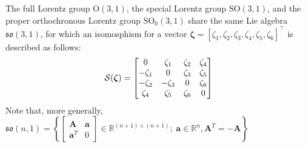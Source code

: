 \begin{example}
    The full Lorentz group $\text{O}(3, 1)$, the special Lorentz group $\text{SO}(3, 1)$, and the proper orthochronous Lorentz group $\text{SO}_0(3, 1)$ share the same Lie algebra $\mathfrak{so}(3, 1)$, for which an isomosphism for a vector $\boldsymbol{\zeta} = [\zeta_1, \zeta_2, \zeta_3, \zeta_4, \zeta_5, \zeta_6]^\top$ is described as follows:
    \begin{align}
        \SL[\boldsymbol{\zeta}] = \begin{bmatrix}
            0 & \zeta_1 & \zeta_2 & \zeta_4 \\
            -\zeta_1 & 0 & \zeta_3 & \zeta_5 \\
            -\zeta_2 & -\zeta_3 & 0 & \zeta_6 \\
            \zeta_4 & \zeta_5 & \zeta_6 & 0
        \end{bmatrix}
    \end{align}
    Note that, more generally, $\mathfrak{so}(n, 1) = \left\{\begin{bmatrix} \mathbf{A} & \mathbf{a}\\
              \mathbf{a}^T & 0 \end{bmatrix} \in \mathbb{R}^{(n+1) \times (n+1)};\; \mathbf{a}\in\mathbb{R}^n, \mathbf{A}^T=-\mathbf{A}\right\}$
\end{example}
